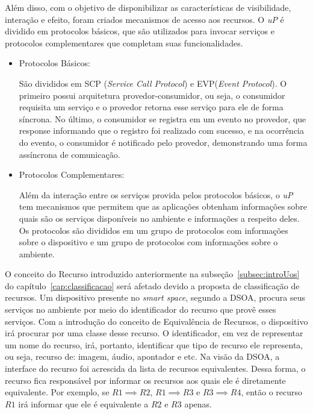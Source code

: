 Além disso, com o objetivo de disponibilizar as características de visibilidade, interação e efeito, foram criados mecanismos de acesso aos recursos. O \emph{uP} é dividido em protocolos básicos, que são utilizados para invocar serviços e protocolos complementares que completam suas funcionalidades.

\begin{itemize}
	\item Protocolos Básicos: 

		São divididos em SCP (\emph{Service Call Protocol}) e EVP(\emph{Event Protocol}). O primeiro possui arquitetura provedor-consumidor, ou seja, o consumidor requisita um serviço e o provedor retorna esse serviço para ele de forma síncrona. No último, o consumidor se registra em um evento no provedor, que response informando que o registro foi realizado com sucesso, e na ocorrência do evento, o consumidor é notificado pelo provedor, demonstrando uma forma assíncrona de comunicação.
	\item Protocolos Complementares:

		Além da interação entre os serviços provida pelos protocolos básicos, o \emph{uP} tem mecanismos que permitem que as aplicações obtenham informações sobre quais são os serviços disponíveis no ambiente e informações a respeito deles. Os protocolos são divididos em um grupo de protocolos com informações sobre o dispositivo e um grupo de protocolos com informações sobre o ambiente. 
\end{itemize}

O conceito do Recurso introduzido anteriormente na subseção~\ref{subsec:introUos} do capítulo~\ref{cap:classificacao} será afetado devido a proposta de classificação de recursos. Um dispositivo presente no \emph{smart space}, segundo a DSOA, procura seus serviços no ambiente por meio do identificador do recurso que provê esses serviços. Com a introdução do conceito de Equivalência de Recursos, o dispositivo irá procurar por uma classe desse recurso. O identificador, em vez de representar um nome do recurso, irá, portanto, identificar que tipo de recurso ele representa, ou seja, recurso de: imagem, áudio, apontador e etc. Na visão da DSOA, a interface do recurso foi acrescida da lista de recursos equivalentes. Dessa forma, o recurso fica responsável por informar os recursos aos quais ele é diretamente equivalente. Por exemplo, se $R1 \implies R2$, $R1 \implies R3$ e $R3 \implies R4$, então o recurso $R1$ irá informar que ele é equivalente a $R2$ e $R3$ apenas.

